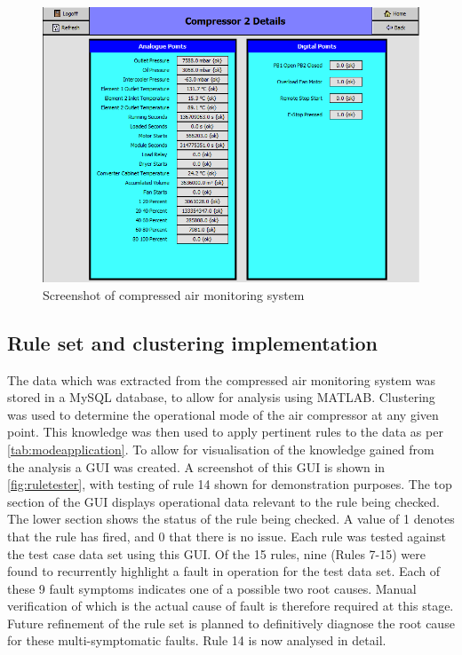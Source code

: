 \begin{figure}
\includegraphics[width = 0.9 \textwidth]{./Images/JACE_Screen.png}
\caption{Screenshot of compressed air monitoring system}
\label{fig:jacescreen}
\end{figure}


\subsection{Rule set and clustering implementation}
The data which was extracted from the compressed air monitoring system was stored in a MySQL database, to allow for analysis using MATLAB. Clustering was used to determine the operational mode of the air compressor at any given point. This knowledge was then used to apply pertinent rules to the data as per \autoref{tab:modeapplication}. To allow for visualisation of the knowledge gained from the analysis a GUI was created. A screenshot of this GUI is shown in \autoref{fig:ruletester}, with testing of rule 14 shown for demonstration purposes. The top section of the GUI displays operational data relevant to the rule being checked. The lower section shows the status of the rule being checked. A value of 1 denotes that the rule has fired, and 0 that there is no issue. Each rule was tested against the test case data set using this GUI. Of the 15 rules, nine (Rules 7-15) were found to recurrently highlight a fault in operation for the test data set. Each of these 9 fault symptoms indicates one of a possible two root causes. Manual verification of which is the actual cause of fault is therefore required at this stage. Future refinement of the rule set is planned to definitively diagnose the root cause for these multi-symptomatic faults. Rule 14 is now analysed in detail.

